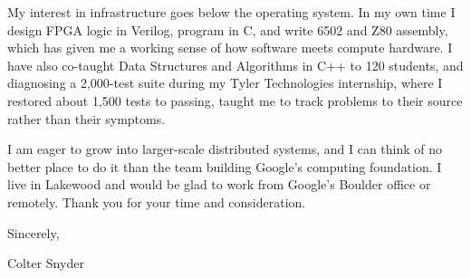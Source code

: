 \documentclass[letterpaper,11pt]{article}
\begin{document}
My interest in infrastructure goes below the operating system. In my own time I design FPGA logic in
Verilog, program in C, and write 6502 and Z80 assembly, which has given me a working sense of how
software meets compute hardware. I have also co-taught Data Structures and Algorithms in C++ to 120
students, and diagnosing a 2,000-test suite during my Tyler Technologies internship, where I restored
about 1,500 tests to passing, taught me to track problems to their source rather than their symptoms.

I am eager to grow into larger-scale distributed systems, and I can think of no better place to do it
than the team building Google's computing foundation. I live in Lakewood and would be glad to work from Google's Boulder office or remotely. Thank you for your time and consideration.

Sincerely,

Colter Snyder
\end{document}
